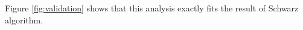 Figure \ref{fig:validation} shows that this analysis exactly
fits the result of Schwarz algorithm.
% 
